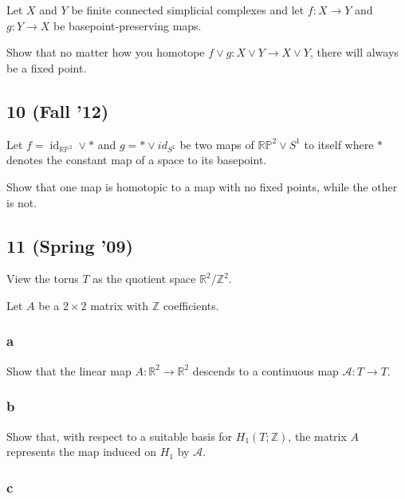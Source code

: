 Let \(X\) and \(Y\) be finite connected simplicial complexes and let
\(f : X \to Y\) and \(g : Y \to X\) be basepoint-preserving maps.

Show that no matter how you homotope
\(f \lor g : X \lor Y \to X \lor Y\), there will always be a fixed
point.

\hypertarget{fall-12-3}{%
\subsection{10 (Fall '12)}\label{fall-12-3}}

Let \(f = \operatorname{id}_{{\mathbb{RP}}^2} \lor \ast\) and
\(g = \ast \lor id_{S^1}\) be two maps of \({\mathbb{RP}}^2 \lor S^1\)
to itself where \(\ast\) denotes the constant map of a space to its
basepoint.

Show that one map is homotopic to a map with no fixed points, while the
other is not.

\hypertarget{spring-09-8}{%
\subsection{11 (Spring '09)}\label{spring-09-8}}

View the torus \(T\) as the quotient space
\({\mathbb{R}}^2 /{\mathbb{Z}}^2\).

Let \(A\) be a \(2 \times 2\) matrix with \({\mathbb{Z}}\) coefficients.

\hypertarget{a-6}{%
\subsubsection{a}\label{a-6}}

Show that the linear map \(A : {\mathbb{R}}^2 \to {\mathbb{R}}^2\)
descends to a continuous map \({\mathcal{A}}: T \to T\).

\hypertarget{b-6}{%
\subsubsection{b}\label{b-6}}

Show that, with respect to a suitable basis for
\(H_1 (T ; {\mathbb{Z}})\), the matrix \(A\) represents the map induced
on \(H_1\) by \({\mathcal{A}}\).

\hypertarget{c-2}{%
\subsubsection{c}\label{c-2}}

